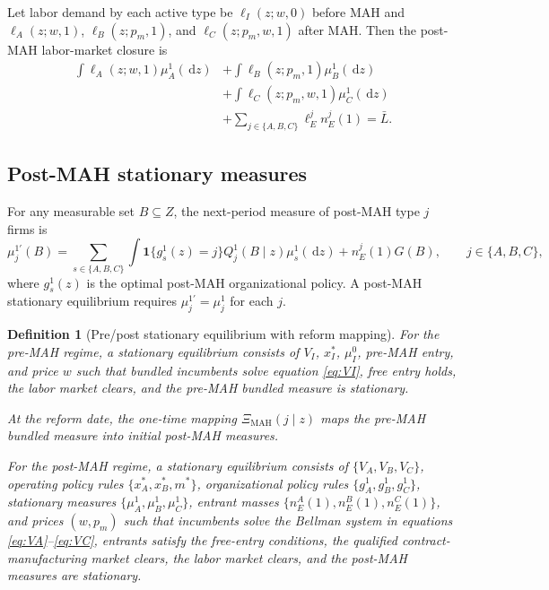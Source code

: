 \documentclass[12pt]{article}
\newtheorem{definition}{Definition}
\newcommand{\1}{\mathbf{1}}
\newcommand{\dd}{\,\mathrm{d}}
\newcommand{\Lbar}{\bar L}
\begin{document}
Let labor demand by each active type be $\ell_I(z;w,0)$ before MAH and $\ell_A(z;w,1)$, $\ell_B(z;p_m,1)$, and $\ell_C(z;p_m,w,1)$ after MAH. Then the post-MAH labor-market closure is
\begin{equation}
\begin{aligned}
\int \ell_A(z;w,1)\mu_A^1(\dd z)
&+\int \ell_B(z;p_m,1)\mu_B^1(\dd z) \\
&+\int \ell_C(z;p_m,w,1)\mu_C^1(\dd z) \\
&+\sum_{j\in\{A,B,C\}}\ell_E^jn_E^j(1)=\Lbar.
\end{aligned}
\label{eq:labor_clear}
\end{equation}

\subsection{Post-MAH stationary measures}

For any measurable set $B\subseteq Z$, the next-period measure of post-MAH type $j$ firms is
\begin{equation}
\mu_j^{1\prime}(B)
=
\sum_{s\in\{A,B,C\}}\int \1\{g_s^1(z)=j\}Q_j^1(B\mid z)\mu_s^1(\dd z)
+n_E^j(1)G(B),
\qquad j\in\{A,B,C\},
\label{eq:stationary_measure_post}
\end{equation}
where $g_s^1(z)$ is the optimal post-MAH organizational policy. A post-MAH stationary equilibrium requires $\mu_j^{1\prime}=\mu_j^1$ for each $j$.

\begin{definition}[Pre/post stationary equilibrium with reform mapping]
For the pre-MAH regime, a stationary equilibrium consists of $V_I$, $x_I^*$, $\mu_I^0$, pre-MAH entry, and price $w$ such that bundled incumbents solve equation \eqref{eq:VI}, free entry holds, the labor market clears, and the pre-MAH bundled measure is stationary.

At the reform date, the one-time mapping $\Xi_{\mathrm{MAH}}(j\mid z)$ maps the pre-MAH bundled measure into initial post-MAH measures.

For the post-MAH regime, a stationary equilibrium consists of $\{V_A,V_B,V_C\}$, operating policy rules $\{x_A^*,x_B^*,m^*\}$, organizational policy rules $\{g_A^1,g_B^1,g_C^1\}$, stationary measures $\{\mu_A^1,\mu_B^1,\mu_C^1\}$, entrant masses $\{n_E^A(1),n_E^B(1),n_E^C(1)\}$, and prices $(w,p_m)$ such that incumbents solve the Bellman system in equations \eqref{eq:VA}--\eqref{eq:VC}, entrants satisfy the free-entry conditions, the qualified contract-manufacturing market clears, the labor market clears, and the post-MAH measures are stationary.
\end{definition}
\end{document}
